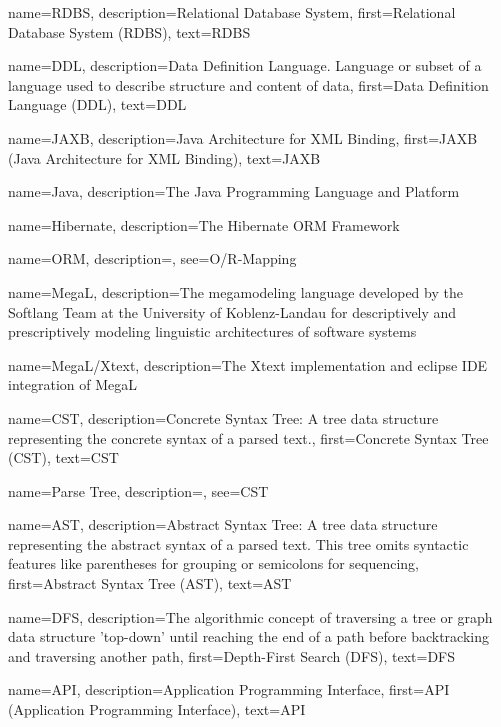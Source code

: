 {
    name=RDBS,
    description={Relational Database System},
    first={Relational Database System (RDBS)},
    text={RDBS}
}

{
    name=DDL,
    description={Data Definition Language. Language or subset of a language used to describe structure and content of data},
    first={Data Definition Language (DDL)},
    text={DDL}
}

{
    name=JAXB,
    description={Java Architecture for XML Binding},
    first={JAXB (Java Architecture for XML Binding)},
    text={JAXB}
}

{
    name=Java,
    description={The Java Programming Language and Platform}
}

{
    name=Hibernate,
    description={The Hibernate \gls{ORM} Framework}
}

{
    name=ORM,
    description={},
    see={O/R-Mapping}
}

{
    name=MegaL,
    description={The megamodeling language developed by the Softlang Team at the University of Koblenz-Landau for descriptively and prescriptively modeling linguistic architectures of software systems}
}

{
    name=MegaL/Xtext,
    description={The Xtext implementation and eclipse IDE integration of \gls{MegaL}}
}

{
    name=CST,
    description={Concrete Syntax Tree: A tree data structure representing the concrete syntax of a parsed text.},
    first={Concrete Syntax Tree (CST)},
    text={CST}
}

{
    name={Parse Tree},
    description={},
    see={CST}
}

{
    name=AST,
    description={Abstract Syntax Tree: A tree data structure representing the abstract syntax of a parsed text. This tree omits syntactic features like parentheses for grouping or semicolons for sequencing},
    first={Abstract Syntax Tree (AST)},
    text={AST}
}

{
    name=DFS,
    description={The algorithmic concept of traversing a tree or graph data structure 'top-down' until reaching the end of a path before backtracking and traversing another path},
    first={Depth-First Search (DFS)},
    text={DFS}
}

{
    name=API,
    description={Application Programming Interface},
    first={API (Application Programming Interface)},
    text={API}
}

